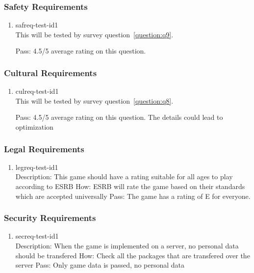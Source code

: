 \documentclass[12pt, titlepage]{article}
\begin{document}
\subsubsection{Safety Requirements}

\begin{enumerate}

\item{safreq-test-id1\\}
This will be tested by survey question~\ref{question:q9}.

Pass: 4.5/5 average rating on this question.
\end{enumerate}

\subsubsection{Cultural Requirements}

\begin{enumerate}

\item{culreq-test-id1\\}
This will be tested by survey question~\ref{question:q8}.

Pass: 4.5/5 average rating on this question. The details could lead to optimization
\end{enumerate}

\subsubsection{Legal Requirements}

\begin{enumerate}

\item{legreq-test-id1\\}
Description: This game should have a rating suitable for all ages to play
according to ESRB How: ESRB will rate the game based on their standards which
are accepted universally Pass: The game has a rating of E for everyone.
\end{enumerate}

\subsubsection{Security Requirements}

\begin{enumerate}

\item{secreq-test-id1\\}
Description: When the game is implemented on a server, no personal data should
be transfered How: Check all the packages that are transfered over the server
Pass: Only game data is passed, no personal data
\end{enumerate}
\end{document}
